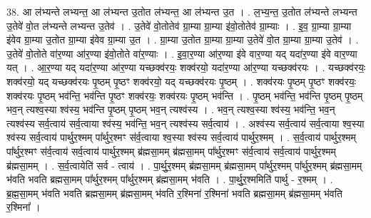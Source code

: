\documentclass[17pt]{extarticle}
\begin{document}
38. आ ल॑भ्यन्ते लभ्यन्त॒ आ ल॑भ्यन्त उ॒तोत ल॑भ्यन्त॒ आ ल॑भ्यन्त उ॒त । . ल॒भ्य॒न्त॒ उ॒तोत ल॑भ्यन्ते लभ्यन्त उ॒तेवे॑ वो॒त ल॑भ्यन्ते लभ्यन्त उ॒तेव॑ । . उ॒तेवे॑ वो॒तोतेव॑ ग्रा॒म्या ग्रा॒म्या इ॑वो॒तोतेव॑ ग्रा॒म्याः । . इ॒व॒ ग्रा॒म्या ग्रा॒म्या इ॑वेव ग्रा॒म्या उ॒तोत ग्रा॒म्या इ॑वेव ग्रा॒म्या उ॒त । . ग्रा॒म्या उ॒तोत ग्रा॒म्या ग्रा॒म्या उ॒तेवे॑ वो॒त ग्रा॒म्या ग्रा॒म्या उ॒तेव॑ । . उ॒तेवे॑ वो॒तोते वा॑र॒ण्या आ॑र॒ण्या इ॑वो॒तोते वा॑र॒ण्याः । . इ॒वा॒र॒ण्या आ॑र॒ण्या इ॑वे वार॒ण्या यद् यदा॑र॒ण्या इ॑वे वार॒ण्या यत् । . आ॒र॒ण्या यद् यदा॑र॒ण्या आ॑र॒ण्या यच्छक्व॑रयः॒ शक्व॑रयो॒ यदा॑र॒ण्या आ॑र॒ण्या यच्छक्व॑रयः । . यच्छक्व॑रयः॒ शक्व॑रयो॒ यद् यच्छक्व॑रयः पृ॒ष्ठम् पृ॒ष्ठꣳ शक्व॑रयो॒ यद् यच्छक्व॑रयः पृ॒ष्ठम् । . शक्व॑रयः पृ॒ष्ठम् पृ॒ष्ठꣳ शक्व॑रयः॒ शक्व॑रयः पृ॒ष्ठम् भव॑न्ति॒ भव॑न्ति पृ॒ष्ठꣳ शक्व॑रयः॒ शक्व॑रयः पृ॒ष्ठम् भव॑न्ति । . पृ॒ष्ठम् भव॑न्ति॒ भव॑न्ति पृ॒ष्ठम् पृ॒ष्ठम् भव॒न् त्यश्व॒स्या श्व॑स्य॒ भव॑न्ति पृ॒ष्ठम् पृ॒ष्ठम् भव॒न् त्यश्व॑स्य । . भव॒न् त्यश्व॒स्या श्व॑स्य॒ भव॑न्ति॒ भव॒न् त्यश्व॑स्य सर्व॒त्वाय॑ सर्व॒त्वाया श्व॑स्य॒ भव॑न्ति॒ भव॒न्
त्यश्व॑स्य सर्व॒त्वाय॑ । . अश्व॑स्य सर्व॒त्वाय॑ सर्व॒त्वाया श्व॒स्या श्व॑स्य सर्व॒त्वाय॑ पार्थुर॒श्मम् पा᳚र्थुर॒श्मꣳ स॑र्व॒त्वाया श्व॒स्या श्व॑स्य सर्व॒त्वाय॑ पार्थुर॒श्मम् । . स॒र्व॒त्वाय॑ पार्थुर॒श्मम् पा᳚र्थुर॒श्मꣳ स॑र्व॒त्वाय॑ सर्व॒त्वाय॑ पार्थुर॒श्मम् ब्र॑ह्मसा॒मम् ब्र॑ह्मसा॒मम् पा᳚र्थुर॒श्मꣳ स॑र्व॒त्वाय॑ सर्व॒त्वाय॑ पार्थुर॒श्मम् ब्र॑ह्मसा॒मम् । . स॒र्व॒त्वायेति॑ सर्व - त्वाय॑ । . पा॒र्थु॒र॒श्मम् ब्र॑ह्मसा॒मम् ब्र॑ह्मसा॒मम् पा᳚र्थुर॒श्मम् पा᳚र्थुर॒श्मम् ब्र॑ह्मसा॒मम् भ॑वति भवति ब्रह्मसा॒मम् पा᳚र्थुर॒श्मम् पा᳚र्थुर॒श्मम् ब्र॑ह्मसा॒मम् भ॑वति । . पा॒र्थु॒र॒श्ममिति॑ पार्थु - र॒श्मम् । . ब्र॒ह्म॒सा॒मम् भ॑वति भवति ब्रह्मसा॒मम् ब्र॑ह्मसा॒मम् भ॑वति र॒श्मिना॑ र॒श्मिना॑ भवति ब्रह्मसा॒मम् ब्र॑ह्मसा॒मम् भ॑वति र॒श्मिना᳚ । \newline
\end{document}
